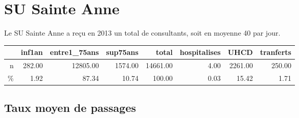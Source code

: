 \documentclass[12pt,english,french,twoside]{book}\usepackage[]{graphicx}\usepackage[]{color}
\begin{document}
\chapter{SU Sainte Anne}




Le SU Sainte Anne a reçu en 2013 un total de  consultants, soit en moyenne 40 par jour.

\begin{table}[ht]
\centering
\begin{tabular}{rrrrrrrr}
  \hline
 & inf1an & entre1\_75ans & sup75ans & total & hospitalises & UHCD & tranferts \\ 
  \hline
n & 282.00 & 12805.00 & 1574.00 & 14661.00 & 4.00 & 2261.00 & 250.00 \\ 
  \% & 1.92 & 87.34 & 10.74 & 100.00 & 0.03 & 15.42 & 1.71 \\ 
   \hline
\end{tabular}
\end{table}


\section{Taux moyen de passages}
\end{document}
